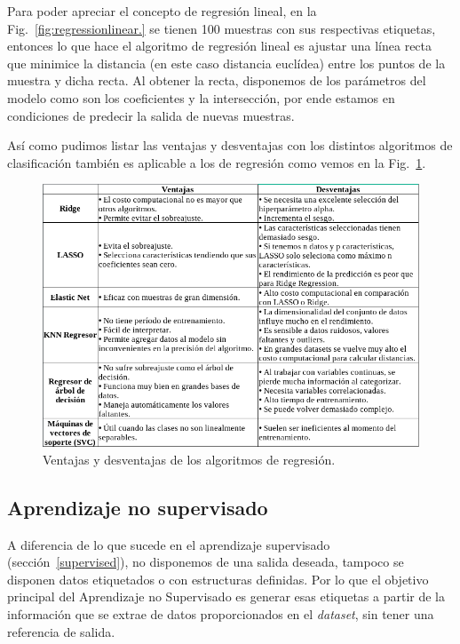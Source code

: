 \documentclass[a4paper,12pt]{article}
\begin{document}
Para poder apreciar el concepto de regresión lineal, en la Fig.~\ref{fig:regressionlinear.} se tienen 100 muestras con sus respectivas etiquetas, entonces lo que hace el algoritmo de regresión lineal es ajustar una línea recta que minimice la distancia (en este caso distancia euclídea) entre los puntos de la muestra y dicha recta. Al obtener la recta, disponemos de los parámetros del modelo como son los coeficientes y la intersección, por ende estamos en condiciones de predecir la salida de nuevas muestras.

Así como pudimos listar las ventajas y desventajas con los distintos algoritmos de clasificación también es aplicable a los de regresión como vemos en la Fig.~\ref{fig:proconsregression.}.

\begin{figure}[H]
	\begin{center}				
	\includegraphics[width=1\textwidth]{tesis_10.png}
  	\caption{Ventajas y desventajas de los algoritmos de regresión.}
  	\label{fig:proconsregression.}
  	\end{center}
\end{figure}

\clearpage

\subsection{Aprendizaje no supervisado} \label{unsupervised}

A diferencia de lo que sucede en el aprendizaje supervisado (sección~\ref{supervised}), no disponemos de una salida deseada, tampoco se disponen datos etiquetados o con estructuras definidas. Por lo que el objetivo principal del Aprendizaje no Supervisado es generar esas etiquetas a partir de la información que se extrae de datos proporcionados en el \textit{dataset}, sin tener una referencia de salida.  
\end{document}
